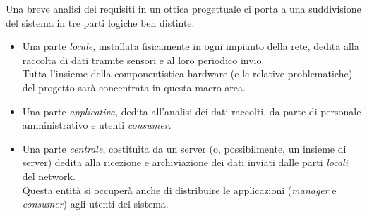 \documentclass[12pt]{article}
\begin{document}
Una breve analisi dei requisiti in un ottica progettuale ci porta a una suddivisione del sistema in tre parti logiche ben distinte: 
\begin{itemize}
	\item Una parte \textit{locale}, installata fisicamente in ogni impianto della rete, dedita alla raccolta di dati tramite sensori e al loro periodico invio.
	\\ Tutta l'insieme della componentistica hardware (e le relative problematiche) del progetto sarà concentrata in questa macro-area.
	\item Una parte \textit{applicativa}, dedita all'analisi dei dati raccolti, da parte di personale amministrativo e utenti \textit{consumer}.
	\item Una parte \textit{centrale}, costituita da un server (o, possibilmente, un insieme di server) dedita alla ricezione e archiviazione dei dati inviati dalle parti \textit{locali} del network.\\
	Questa entità si occuperà anche di distribuire le applicazioni (\textit{manager} e \textit{consumer}) agli utenti del sistema.
\end{itemize}
\end{document}
